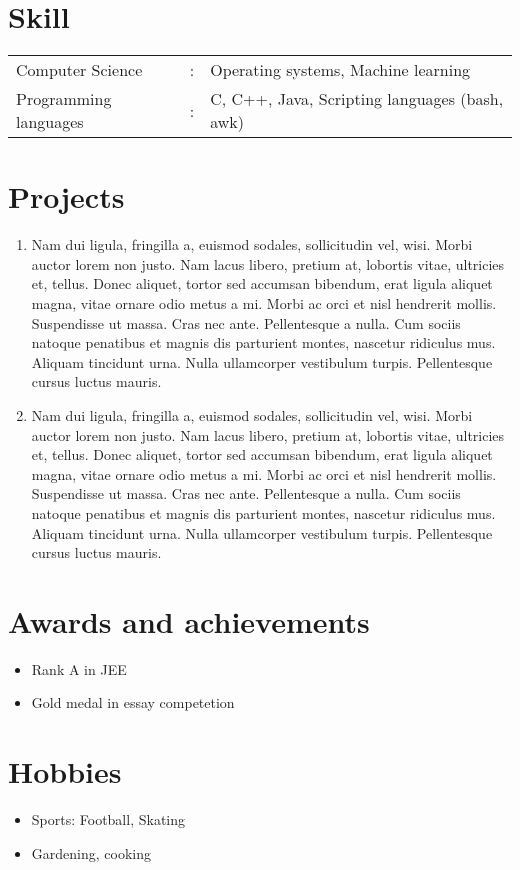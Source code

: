 \documentclass{article}
\begin{document}
\section*{Skill}
\begin{tabular}{l c l}
    Computer Science & : & Operating systems, Machine learning  \\
    Programming languages & : & C, C++, Java, Scripting languages (bash, awk) \\
\end{tabular}

\section*{Projects}
\begin{enumerate}
    \item Nam dui ligula, fringilla a, euismod sodales, sollicitudin vel, wisi. Morbi auctor lorem non justo. Nam lacus
libero, pretium at, lobortis vitae, ultricies et, tellus. Donec aliquet, tortor sed accumsan bibendum, erat ligula
aliquet magna, vitae ornare odio metus a mi. Morbi ac orci et nisl hendrerit mollis. Suspendisse ut massa.
Cras nec ante. Pellentesque a nulla. Cum sociis natoque penatibus et magnis dis parturient montes, nascetur
ridiculus mus. Aliquam tincidunt urna. Nulla ullamcorper vestibulum turpis. Pellentesque cursus luctus
mauris.
    \item Nam dui ligula, fringilla a, euismod sodales, sollicitudin vel, wisi. Morbi auctor lorem non justo. Nam lacus
libero, pretium at, lobortis vitae, ultricies et, tellus. Donec aliquet, tortor sed accumsan bibendum, erat ligula
aliquet magna, vitae ornare odio metus a mi. Morbi ac orci et nisl hendrerit mollis. Suspendisse ut massa.
Cras nec ante. Pellentesque a nulla. Cum sociis natoque penatibus et magnis dis parturient montes, nascetur
ridiculus mus. Aliquam tincidunt urna. Nulla ullamcorper vestibulum turpis. Pellentesque cursus luctus
mauris.
\end{enumerate}

\section*{Awards and achievements}
\begin{itemize}
\renewcommand\labelitemi{--}
    \item Rank A in JEE
    \item Gold medal in essay competetion
\end{itemize}

\section*{Hobbies}
\begin{itemize}
\renewcommand\labelitemi{--}
    \item Sports: Football, Skating
    \item Gardening, cooking
\end{itemize}
\end{document}
